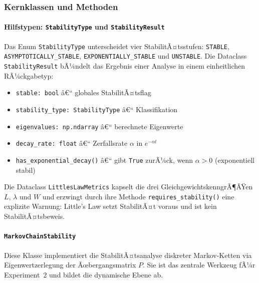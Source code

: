 ﻿\documentclass[a4paper,12pt]{scrreprt}
\theoremstyle{definition}
\begin{document}
\subsubsection{Kernklassen und Methoden}
\label{subsubsec:klassen}

\paragraph{Hilfstypen: \texttt{StabilityType} und \texttt{StabilityResult}}

Das Enum \texttt{StabilityType} unterscheidet vier StabilitÃ¤tsstufen:
\texttt{STABLE}, \texttt{ASYMPTOTICALLY\_STABLE},
\texttt{EXPONEN\newline TIALLY\_STABLE} und \texttt{UNSTABLE}.  Die Dataclass
\texttt{StabilityResult} bÃ¼ndelt das Ergebnis einer Analyse in einem
einheitlichen RÃ¼ckgabetyp:

\begin{itemize}
	\item \texttt{stable: bool} â€“ globales StabilitÃ¤tsflag
	\item \texttt{stability\_type: StabilityType} â€“ Klassifikation
	\item \texttt{eigenvalues: np.ndarray} â€“ berechnete Eigenwerte
	\item \texttt{decay\_rate: float} â€“ Zerfallsrate $\alpha$ in $e^{-\alpha t}$
	\item \texttt{has\_exponential\_decay()} â€“ gibt \texttt{True}
	zurÃ¼ck, wenn $\alpha > 0$ (exponentiell stabil)
\end{itemize}

Die Dataclass \texttt{LittlesLawMetrics} kapselt die drei
GleichgewichtskenngrÃ¶ÃŸen $L$, $\lambda$ und $W$ und erzwingt durch
ihre Methode \texttt{requires\_stability()} eine explizite Warnung:
Little's Law setzt StabilitÃ¤t voraus und ist kein StabilitÃ¤tsbeweis.

\paragraph{\texttt{MarkovChainStability}}

Diese Klasse implementiert die StabilitÃ¤tsanalyse diskreter
Markov-Ketten via Eigenwertzerlegung der Ãœbergangsmatrix $P$.  Sie
ist das zentrale Werkzeug fÃ¼r Experiment~2 und bildet die dynamische
Ebene ab.
\end{document}
